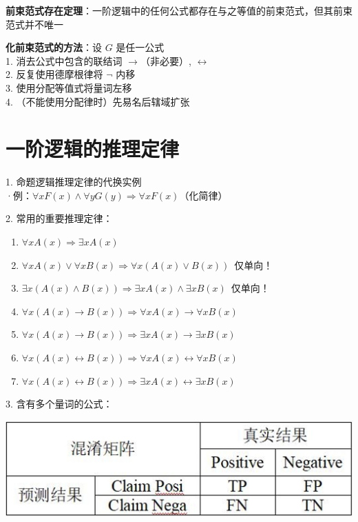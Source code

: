 \textbf{前束范式存在定理}：一阶逻辑中的任何公式都存在与之等值的前束范式，但其前束范式并不唯一

\textbf{化前束范式的方法}：设 $G$ 是任一公式\\
1. 消去公式中包含的联结词 $\rightarrow$（非必要）, $\leftrightarrow$\\
2. 反复使用德摩根律将 $\neg$ 内移\\
3. 使用分配等值式将量词左移\\
4. （不能使用分配律时）先易名后辖域扩张

\section*{一阶逻辑的推理定律}

1. 命题逻辑推理定律的代换实例\\
·例：$\forall x F(x) \land \forall y G(y) \Rightarrow \forall x F(x)$（化简律）

2. 常用的重要推理定律：
\begin{enumerate}
	\item $\forall x A(x) \Rightarrow \exists x A(x)$
	\item $\forall x A(x) \vee \forall x B(x) \Rightarrow \forall x (A(x) \vee B(x))$~仅单向！
	\item $\exists x (A(x) \land B(x)) \Rightarrow \exists x A(x) \land \exists x B(x)$~仅单向！
	\item $\forall x (A(x) \rightarrow B(x)) \Rightarrow \forall x A(x) \rightarrow \forall x B(x)$
	\item $\forall x (A(x) \rightarrow B(x)) \Rightarrow \exists x A(x) \rightarrow \exists x B(x)$
	\item $\forall x (A(x) \leftrightarrow B(x)) \Rightarrow \forall x A(x) \leftrightarrow \forall x B(x)$
	\item $\forall x (A(x) \leftrightarrow B(x)) \Rightarrow \exists x A(x) \leftrightarrow \exists x B(x)$
\end{enumerate}

3. 含有多个量词的公式：

\begin{figurehere}
	\centering
	\includegraphics[width=0.8\linewidth]{image01}
	\label{fig:image01}
\end{figurehere}


